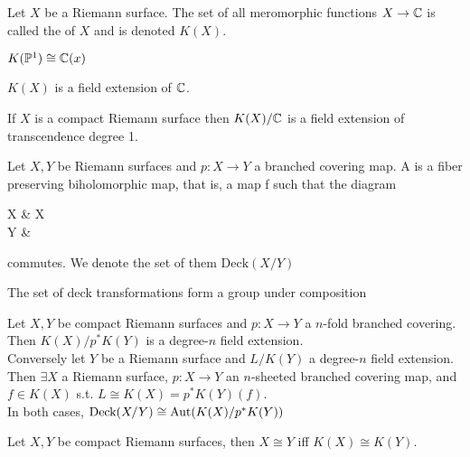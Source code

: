 \documentclass{article}
\begin{document}
\begin{definition}
	Let $X$ be a Riemann surface. The set of all meromorphic functions $X \to \mathbb{C}$ is called the  of $X$ and is denoted $K(X)$. 
\end{definition}

\begin{example}
	$K(\mathbb{P}^1) \cong \mathbb{C}(x)$
\end{example}

\begin{prop}
	$K(X)$ is a field extension of $\mathbb{C}$. 
\end{prop}

\begin{prop}
	If $X$ is a compact Riemann surface then $K(X)/\mathbb{C}$ is a field extension of transcendence degree 1.  
\end{prop}

\begin{definition}
	Let $X, Y$ be Riemann surfaces and $p : X \to Y$ a branched covering map. A  is a fiber preserving biholomorphic map, that is, a map f such that the diagram
	\begin{tkz}
		X \arrow[r,"f"] \arrow[d,"p"'] & X \arrow[dl,"p"]\\
		Y &
	\end{tkz}
	commutes. We denote the set of them  $\text{Deck}(X/Y)$
\end{definition}

\begin{prop}
	The set of deck transformations form a group under composition
\end{prop}

\begin{theorem}
	Let $X,Y$ be compact Riemann surfaces and $p:X \to Y$ a $n$-fold branched covering. Then $K(X)/p^\ast K(Y)$ is a degree-$n$ field extension. \\
	Conversely let $Y$ be a Riemann surface and $L/K(Y)$ a degree-$n$ field extension. Then $\exists X$ a Riemann surface, $p:X \to Y$ an $n$-sheeted branched covering map, and $f \in K(X)$ s.t. $L\cong K(X)=p^\ast K(Y)(f)$. \\
	In both cases, $\text{Deck}(X/Y) \cong \operatorname{Aut}(K(X) / p^\ast K(Y))$  
\end{theorem}

\begin{corollary}
	Let $X,Y$ be compact Riemann surfaces, then $X\cong Y$ iff $K(X) \cong K(Y)$. 
\end{corollary}
\end{document}
